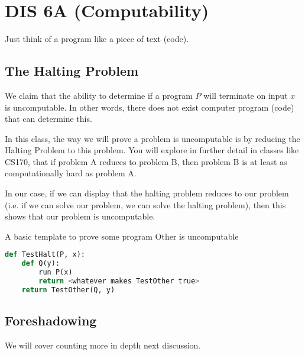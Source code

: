 \section{DIS 6A (Computability)}

Just think of a program like a piece of text (code). 

\subsection{The Halting Problem}
\begin{definition}
    We claim that the ability to determine if a program $P$ will terminate on input $x$ is uncomputable. In other words, there does not exist computer program (code) that can determine this. 
\end{definition}

In this class, the way we will prove a problem is uncomputable is by reducing the Halting Problem to this problem. You will explore in further detail in classes like CS170, that if problem A reduces to problem B, then problem B is at least as computationally hard as problem A. 

In our case, if we can display that the halting problem reduces to our problem (i.e. if we can solve our problem, we can solve the halting problem), then this shows that our problem is uncomputable. 

A basic template to prove some program $\mathrm{Other}$ is uncomputable
\begin{lstlisting}[language=Python]
def TestHalt(P, x):
    def Q(y):
        run P(x)
        return <whatever makes TestOther true>
    return TestOther(Q, y)
\end{lstlisting}

\subsection{Foreshadowing}
We will cover counting more in depth next discussion. 